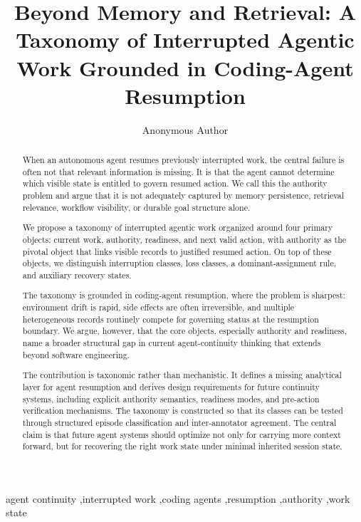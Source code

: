 \documentclass[preprint,12pt]{elsarticle}
\begin{document}
\begin{frontmatter}

\title{Beyond Memory and Retrieval: A Taxonomy of Interrupted Agentic Work Grounded in Coding-Agent Resumption}

\author[inst1]{Anonymous Author}

\begin{abstract}
When an autonomous agent resumes previously interrupted work, the central failure is often not that relevant information is missing. It is that the agent cannot determine which visible state is entitled to govern resumed action. We call this the authority problem and argue that it is not adequately captured by memory persistence, retrieval relevance, workflow visibility, or durable goal structure alone.

We propose a taxonomy of interrupted agentic work organized around four primary objects: current work, authority, readiness, and next valid action, with authority as the pivotal object that links visible records to justified resumed action. On top of these objects, we distinguish interruption classes, loss classes, a dominant-assignment rule, and auxiliary recovery states.

The taxonomy is grounded in coding-agent resumption, where the problem is sharpest: environment drift is rapid, side effects are often irreversible, and multiple heterogeneous records routinely compete for governing status at the resumption boundary. We argue, however, that the core objects, especially authority and readiness, name a broader structural gap in current agent-continuity thinking that extends beyond software engineering.

The contribution is taxonomic rather than mechanistic. It defines a missing analytical layer for agent resumption and derives design requirements for future continuity systems, including explicit authority semantics, readiness modes, and pre-action verification mechanisms. The taxonomy is constructed so that its classes can be tested through structured episode classification and inter-annotator agreement. The central claim is that future agent systems should optimize not only for carrying more context forward, but for recovering the right work state under minimal inherited session state.
\end{abstract}

\begin{keyword}
agent continuity \sep interrupted work \sep coding agents \sep resumption \sep authority \sep work state
\end{keyword}

\end{frontmatter}
\end{document}
